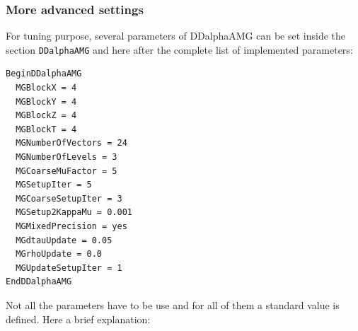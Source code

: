 \subsubsection{More advanced settings}
For tuning purpose, several parameters of DDalphaAMG can be set inside the section \texttt{DDalphaAMG} and here after the complete list of implemented parameters: 
\begin{Verbatim}[fontsize=\small]
BeginDDalphaAMG
  MGBlockX = 4
  MGBlockY = 4
  MGBlockZ = 4
  MGBlockT = 4
  MGNumberOfVectors = 24
  MGNumberOfLevels = 3
  MGCoarseMuFactor = 5
  MGSetupIter = 5
  MGCoarseSetupIter = 3
  MGSetup2KappaMu = 0.001
  MGMixedPrecision = yes
  MGdtauUpdate = 0.05
  MGrhoUpdate = 0.0
  MGUpdateSetupIter = 1
EndDDalphaAMG
\end{Verbatim}
Not all the parameters have to be use and for all of them a standard value is defined. Here a brief explanation:
